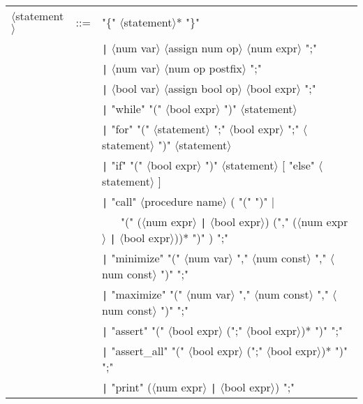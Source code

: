 \documentclass[a4paper]{article}
\begin{document}
{\begin{center}
\begin{tabular}{lcl}
$\langle$statement$\rangle$ & ::= & "\{" $\langle$statement$\rangle$* "\}"                                                                    \\
            &     & \verb_|_ $\langle$num var$\rangle$ $\langle$assign num op$\rangle$ $\langle$num expr$\rangle$ ";"                         \\
            &     & \verb_|_ $\langle$num var$\rangle$ $\langle$num op postfix$\rangle$ ";"                                                   \\
            &     & \verb_|_ $\langle$bool var$\rangle$ $\langle$assign bool op$\rangle$ $\langle$bool expr$\rangle$ ";"                      \\
            &     & \verb_|_ "while" "(" $\langle$bool expr$\rangle$ ")" $\langle$statement$\rangle$                                          \\
            &     & \verb_|_ "for" "(" $\langle$statement$\rangle$ ";" $\langle$bool expr$\rangle$ ";" $\langle$statement$\rangle$ ")" $\langle$statement$\rangle$            \\
            &     & \verb_|_ "if" "(" $\langle$bool expr$\rangle$ ")" $\langle$statement$\rangle$ [ "else" $\langle$statement$\rangle$ ]      \\
            &     & \verb_|_ "call" $\langle$procedure name$\rangle$ ( "(" ")" |                                                              \\
            &     & \verb_ _ \verb| |  "(" ($\langle$num expr$\rangle$ \verb_|_ $\langle$bool expr$\rangle$) ("," ($\langle$num expr$\rangle$ \verb_|_ $\langle$bool expr$\rangle$))* ")" ) ";"  \\
            &     & \verb_|_ "minimize" "(" $\langle$num var$\rangle$ "," $\langle$num const$\rangle$ "," $\langle$num const$\rangle$ ")" ";" \\
            &     & \verb_|_ "maximize" "(" $\langle$num var$\rangle$ "," $\langle$num const$\rangle$ "," $\langle$num const$\rangle$ ")" ";" \\
            &     & \verb_|_ "assert" "(" $\langle$bool expr$\rangle$ (";" $\langle$bool expr$\rangle$)* ")" ";"                              \\
            &     & \verb_|_ "assert\_all" "(" $\langle$bool expr$\rangle$ (";" $\langle$bool expr$\rangle$)* ")" ";"                         \\
            &     & \verb_|_ "print" ($\langle$num expr$\rangle$ \verb_|_ $\langle$bool expr$\rangle$) ";"                                    \\

\end{tabular}
\end{center}}
\end{document}
